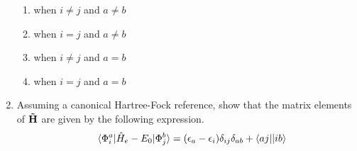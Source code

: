 \documentclass[fleqn,11pt]{article}
\begin{document}
\begin{enumerate}
\begin{enumerate}
    \item {} when $i\neq j$ and $a\neq b$
    \item {} when $i=j$ and $a\neq b$
    \item {} when $i\neq j$ and $a=b$
    \item {} when $i=j$ and $a=b$
  \end{enumerate}
  \item Assuming a canonical Hartree-Fock reference, show that the matrix elements of $\mathbf{\tilde{H}}$ are given by the following expression.
\begin{align}
&&
  \langle\Phi_i^a|\hat{H}_e-E_0|\Phi_j^b\rangle
=
  (\epsilon_a-\epsilon_i)\delta_{ij}\delta_{ab}
+
  \langle aj||ib\rangle
\end{align}
\end{enumerate}
\end{document}
